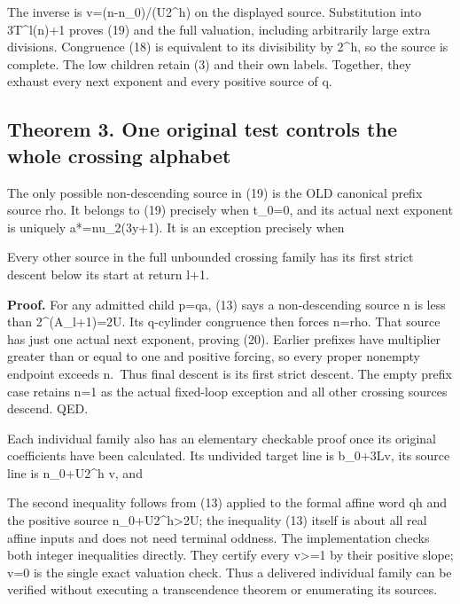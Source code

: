 
The inverse is v=(n-n\_0)/(U2\^{}h) on the displayed source.
Substitution into 3T\^{}l(n)+1 proves (19) and the full valuation,
including arbitrarily large extra divisions. Congruence (18) is
equivalent to its divisibility by 2\^{}h, so the source is complete. The
low children retain (3) and their own labels. Together, they exhaust
every next exponent and every positive source of q.

\subsection{Theorem 3. One original test controls the whole crossing
alphabet}

The only possible non-descending source in (19) is the OLD canonical
prefix source rho. It belongs to (19) precisely when t\_0=0, and its
actual next exponent is uniquely a*=nu\_2(3y+1). It is an exception
precisely when


Every other source in the full unbounded crossing family has its first
strict descent below its start at return l+1.

\textbf{Proof.} For any admitted child p=qa, (13) says a non-descending
source n is less than 2\^{}(A\_l+1)=2U. Its q-cylinder congruence then
forces n=rho. That source has just one actual next exponent, proving
(20). Earlier prefixes have multiplier greater than or equal to one and
positive forcing, so every proper nonempty endpoint exceeds n.~Thus
final descent is its first strict descent. The empty prefix case retains
n=1 as the actual fixed-loop exception and all other crossing sources
descend. QED.

Each individual family also has an elementary checkable proof once its
original coefficients have been calculated. Its undivided target line is
b\_0+3Lv, its source line is n\_0+U2\^{}h v, and


The second inequality follows from (13) applied to the formal affine
word qh and the positive source n\_0+U2\^{}h\textgreater2U; the
inequality (13) itself is about all real affine inputs and does not need
terminal oddness. The implementation checks both integer inequalities
directly. They certify every v\textgreater=1 by their positive slope;
v=0 is the single exact valuation check. Thus a delivered individual
family can be verified without executing a transcendence theorem or
enumerating its sources.

